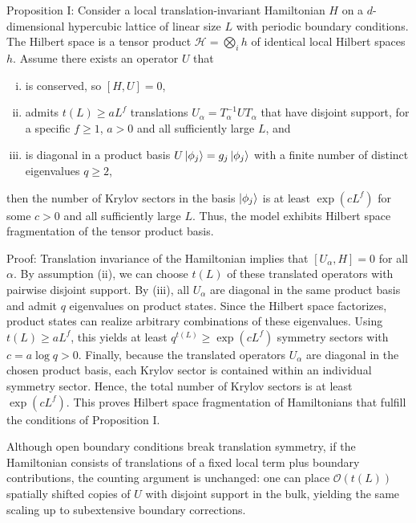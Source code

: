\documentclass[
 reprint,
 amsmath,amssymb,
 aps,floatfix,prl,superscriptaddress
]{revtex4-2}
\begin{document}
Proposition I: Consider a local translation-invariant Hamiltonian $H$ on a $d$-dimensional hypercubic lattice of linear size $L$ with periodic boundary conditions. The Hilbert space is a tensor product 
$\mathcal{H}= \bigotimes_i h$ of identical local Hilbert spaces $h$.
Assume there exists an operator $U$ that
\begin{enumerate}[i)]
    \item is conserved, so $[H, U] = 0$,
    \item admits $t(L) \geq a L^f$ translations $U_\alpha = T^{-1}_\alpha U T_\alpha$ that have disjoint support, for a specific $f \geq 1$, $a>0$ and all sufficiently large $L$, and
    \item is diagonal in a product basis $U \ket{\phi_j} = g_{j} \ket{\phi_j}$ with a finite number of distinct eigenvalues $q \geq 2$,
\end{enumerate}
then the number of Krylov sectors in the basis $\ket{\phi_j}$ is at least $\exp(cL^f)$ for some $c > 0$ and all sufficiently large $L$. Thus, the model exhibits Hilbert space fragmentation of the tensor product basis. 

Proof: Translation invariance of the Hamiltonian implies that $[U_\alpha, H] = 0$ for all $\alpha$. By assumption (ii), we can choose $t(L)$ of these translated operators with pairwise disjoint support. By (iii), all $U_\alpha$ are diagonal in the same product basis and admit $q$ eigenvalues on product states. Since the Hilbert space factorizes, product states can realize arbitrary combinations of these eigenvalues. Using $t(L)\ge aL^f$, this yields at least $q^{t(L)}\ge \exp(cL^f)$ symmetry sectors with $c=a\log q>0$. Finally, because the translated operators $U_\alpha$ are diagonal in the chosen product basis, each Krylov sector is contained within an individual symmetry sector. Hence, the total number of Krylov sectors is at least $\exp(cL^f)$. This proves Hilbert space fragmentation of Hamiltonians that fulfill the conditions of Proposition I.

Although open boundary conditions break translation symmetry, if the Hamiltonian consists of translations of a fixed local term plus boundary contributions, the counting argument is unchanged: one can place $\mathcal{O}(t(L))$ spatially shifted copies of $U$ with disjoint support in the bulk, yielding the same scaling up to subextensive boundary corrections.
\end{document}
